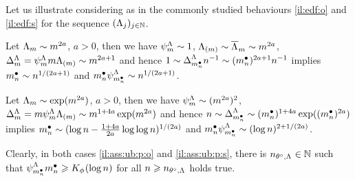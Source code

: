 \begin{il}\label{il:ass:ub:p}
Let us illustrate  considering as in  the commonly studied behaviours \ref{il:edf:o} and \ref{il:edf:s} for the sequence  $\Nsuite[j]{\iSv[j]}$.
\begin{Liste}[]
\item[\mylabel{il:ass:ub:p:o}{\dg\bfseries{(o)}}]
Let $\iSv[\Di]\sim \Di^{2a}$, $a>0$, then  we have $\cmSv\sim1$, $\miSv\sim \oiSv\sim\Di^{2a}$, $\DipenSv=\cmSv \Di \miSv\sim \Di^{2a+1}$ and hence $1\sim\DipenSv[\sDi{\ssY}]\ssY^{-1}\sim(\sDi{\ssY})^{2a+1}\ssY^{-1}$ implies $\sDi{\ssY}\sim\ssY^{1/(2a+1)}$ and $\sDi{\ssY}\cmSv[\sDi{\ssY}]\sim\ssY^{1/(2a+1)}$.
\item[\mylabel{il:ass:ub:p:s}{\dg\bfseries{(s)}}]
Let $\iSv[\Di]\sim \exp(\Di^{2a})$, $a>0$, then  we have $\cmSv\sim(\Di^{2a})^2$, $\DipenSv=\Di \cmSv \miSv\sim \Di^{1+4a}\exp(\Di^{2a})$ and hence $\ssY\sim\DipenSv[\sDi{\ssY}]\sim (\sDi{\ssY})^{1+4a}\exp((\sDi{\ssY})^{2a})$ implies $\sDi{\ssY}\sim(\log\ssY-\tfrac{1+4a}{2a}\log\log\ssY)^{1/(2a)}$ and $\sDi{\ssY}\cmSv[\sDi{\ssY}]\sim (\log \ssY)^{2+1/(2a)}$.
\end{Liste}
Clearly, in both cases \ref{il:ass:ub:p:o} and \ref{il:ass:ub:p:s}, there is ${\ssY}_{\fxdf,\iSv}\in\Nz$ such that $\cmiSv[\sDi{\ssY}]\sDi{\ssY}\geq K_{\fydf}(\log\ssY)$  for all $\ssY\geq{\ssY}_{\fxdf,\iSv}$ holds true.
\end{il}

